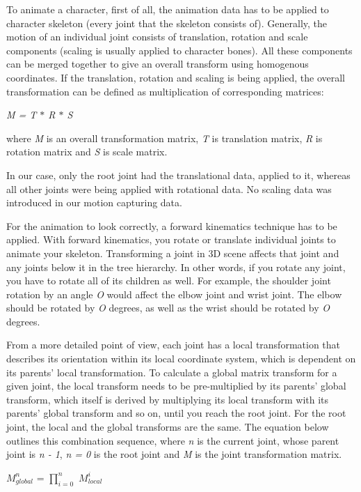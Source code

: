 \documentclass[times, 10pt,twocolumn]{article}
\begin{document}
To animate a character, first of all, the animation data has to be applied to character skeleton (every joint that the skeleton consists of). Generally, the motion of an individual joint consists of translation, rotation and scale components (scaling is usually applied to character bones). All these components can be merged together to give an overall transform using homogenous coordinates.  If the translation, rotation and scaling is being applied, the overall transformation can be defined as multiplication of corresponding matrices:

\begin{center}
\emph{M = T $\ast$ R $\ast$ S}
\end{center}
where \emph{M} is an overall transformation matrix, \emph{T} is translation matrix, \emph{R} is rotation matrix and \emph{S} is scale matrix.

In our case, only the root joint had the translational data, applied to it, whereas all other joints were being applied with rotational data. No scaling data was introduced in our motion capturing data.

For the animation to look correctly, a forward kinematics technique has to be applied. With forward kinematics, you rotate or translate individual joints to  animate your skeleton. Transforming a joint in 3D scene affects that joint and any joints below it in the tree hierarchy. In other words, if you rotate any joint, you have to rotate all of its children as well. For example, the shoulder joint rotation by an angle \emph{O} would affect the elbow joint and wrist joint. The elbow should be rotated by \emph{O} degrees, as well as the wrist should be rotated by \emph{O} degrees.

From a more detailed point of view, each joint has a local transformation that describes its orientation within its local coordinate system, which is dependent on its parents' local transformation. To calculate a global matrix transform for a given joint, the local transform needs to be pre-multiplied by its parents' global transform, which itself is  derived by multiplying its local transform with its parents' global transform and so on, until you reach the root joint. For the root joint, the local and the global transforms are the same. The equation below outlines this combination sequence, where \emph{n} is the current joint, whose parent joint is \emph{n - 1}, \emph{n = 0} is the root joint and \emph{M} is the joint transformation matrix.

\begin{center}
$M^{n}_{global}$ = $\prod^{n}_{i = 0}$ $M^{i}_{local}$
\end{center}
\end{document}
